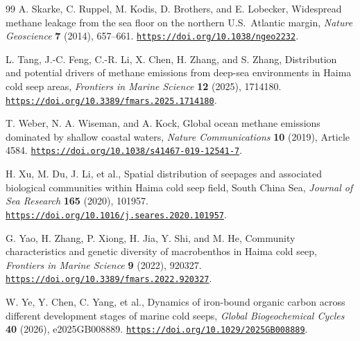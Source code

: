 \documentclass[11pt,letterpaper]{article}
\begin{document}
\begin{thebibliography}{99}
A. Skarke, C. Ruppel, M. Kodis, D. Brothers, and E. Lobecker,
Widespread methane leakage from the sea floor on the northern U.S.\ Atlantic margin,
\emph{Nature Geoscience} \textbf{7} (2014), 657--661.
\href{https://doi.org/10.1038/ngeo2232}
{\nolinkurl{https://doi.org/10.1038/ngeo2232}}.

L. Tang, J.-C. Feng, C.-R. Li, X. Chen, H. Zhang, and S. Zhang,
Distribution and potential drivers of methane emissions from deep-sea environments
in Haima cold seep areas,
\emph{Frontiers in Marine Science} \textbf{12} (2025), 1714180.
\href{https://doi.org/10.3389/fmars.2025.1714180}
{\nolinkurl{https://doi.org/10.3389/fmars.2025.1714180}}.

T. Weber, N. A. Wiseman, and A. Kock,
Global ocean methane emissions dominated by shallow coastal waters,
\emph{Nature Communications} \textbf{10} (2019), Article 4584.
\href{https://doi.org/10.1038/s41467-019-12541-7}
{\nolinkurl{https://doi.org/10.1038/s41467-019-12541-7}}.

H. Xu, M. Du, J. Li, et al.,
Spatial distribution of seepages and associated biological communities within
Haima cold seep field, South China Sea,
\emph{Journal of Sea Research} \textbf{165} (2020), 101957.
\href{https://doi.org/10.1016/j.seares.2020.101957}
{\nolinkurl{https://doi.org/10.1016/j.seares.2020.101957}}.

G. Yao, H. Zhang, P. Xiong, H. Jia, Y. Shi, and M. He,
Community characteristics and genetic diversity of macrobenthos in Haima cold seep,
\emph{Frontiers in Marine Science} \textbf{9} (2022), 920327.
\href{https://doi.org/10.3389/fmars.2022.920327}
{\nolinkurl{https://doi.org/10.3389/fmars.2022.920327}}.

W. Ye, Y. Chen, C. Yang, et al.,
Dynamics of iron-bound organic carbon across different development stages of marine cold seeps,
\emph{Global Biogeochemical Cycles} \textbf{40} (2026), e2025GB008889.
\href{https://doi.org/10.1029/2025GB008889}
{\nolinkurl{https://doi.org/10.1029/2025GB008889}}.

\end{thebibliography}
\end{document}
